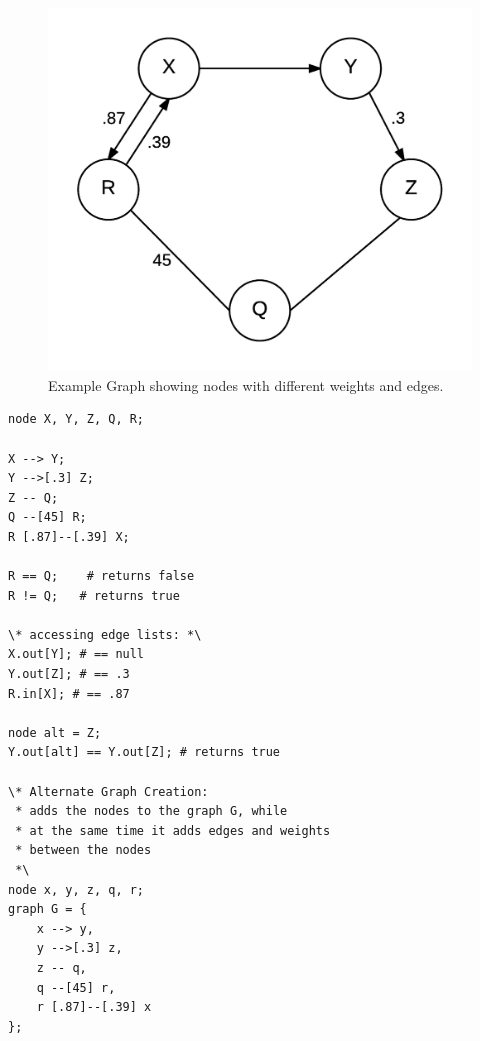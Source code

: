 \documentclass{article}
\begin{document}
\begin{figure}[H]
\centering
\includegraphics{graphs/node_operators_example.png}
\caption{Example Graph showing nodes with different weights and edges.}
\label{fig:node-ops}
\end{figure}


\begin{lstlisting}[language=pltLang, caption=Shows the use of node operators that creates the graph in Figure \ref{fig:node_ops}., label=lst:node-ops]
node X, Y, Z, Q, R;

X --> Y;
Y -->[.3] Z;
Z -- Q;
Q --[45] R;
R [.87]--[.39] X;

R == Q;    # returns false
R != Q;   # returns true

\* accessing edge lists: *\
X.out[Y]; # == null
Y.out[Z]; # == .3
R.in[X]; # == .87

node alt = Z;
Y.out[alt] == Y.out[Z]; # returns true

\* Alternate Graph Creation:
 * adds the nodes to the graph G, while
 * at the same time it adds edges and weights
 * between the nodes
 *\
node x, y, z, q, r;
graph G = {
    x --> y,
    y -->[.3] z,
    z -- q,
    q --[45] r,
    r [.87]--[.39] x
};
    

\end{lstlisting}

\end{document}
